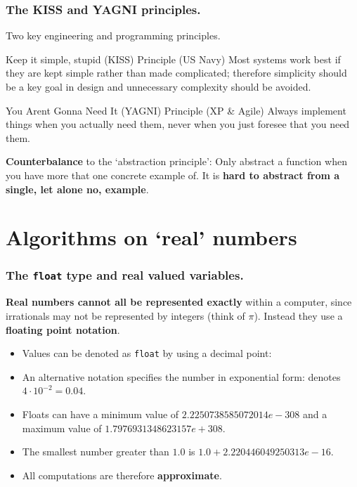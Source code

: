 \documentclass{beamer} %
\newcommand\emc[1]{\textcolor{brightblue}{\textbf{#1}}}
\begin{document}
\begin{frame}
\frametitle{The KISS and YAGNI principles.}

Two key engineering and programming principles.

\begin{block}{Keep it simple, stupid (KISS) Principle (US Navy)}
Most systems work best if they are kept simple rather than made complicated; therefore simplicity should be a key goal in design and unnecessary complexity should be avoided.
\end{block}

\begin{block}{You Arent Gonna Need It (YAGNI) Principle (XP \& Agile)}
Always implement things when you actually need them, never when you just foresee that you need them.
\end{block}

\emc{Counterbalance} to the `abstraction principle': Only abstract a function when you have more that one concrete example of. It is \emc{hard to abstract from a single, let alone no, example}.

\end{frame}

\section{Algorithms on `real' numbers}

\begin{frame}
\frametitle{The \texttt{float} type and real valued variables.}

\emc{Real numbers cannot all be represented exactly} within a computer, since irrationals may not be represented by integers (think of $\pi$). Instead they use a \emc{floating point notation}.


\begin{itemize}
	\item Values can be denoted as \texttt{float} by using a decimal point:
	\item An alternative notation specifies the number in exponential form:
	denotes $4 \cdot 10^{-2} = 0.04$.
	\item Floats can have a minimum value of $2.2250738585072014e-308$ and a maximum value of $1.7976931348623157e+308$.
	\item The smallest number greater than $1.0$ is $1.0 + 2.220446049250313e-16$.
	\item All computations are therefore \emc{approximate}.
\end{itemize}

\end{frame}
\end{document}
